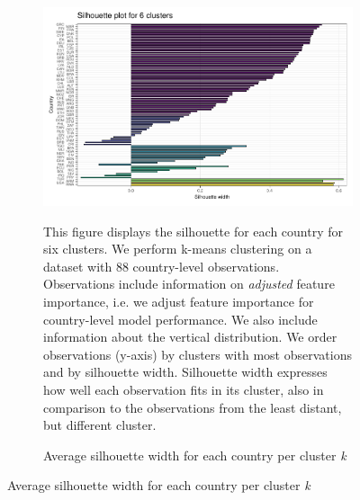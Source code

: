  \begin{figure}[ht!]\ContinuedFloat
   \centering
   \begin{subfigure}[b]{\textwidth}
   \centering
    \caption{Average silhouette width for each country per cluster \textit{k}} \label{fig:G4_silhouette_2}
   \includegraphics{Figures_Appendix/Figure_Silhouette_Clusters_2.pdf}
   \begin{subcaption2}
     This figure displays the silhouette for each country for six clusters. We perform k-means clustering on a dataset with 88 country-level observations. Observations include information on \textit{adjusted} feature importance, i.e. we adjust feature importance for country-level model performance. We also include information about the vertical distribution. We order observations (y-axis) by clusters with most observations and by silhouette width. Silhouette width expresses how well each observation fits in its cluster, also in comparison to the observations from the least distant, but different cluster.
   \end{subcaption2}
   \end{subfigure}
 \end{figure}
 \clearpage

